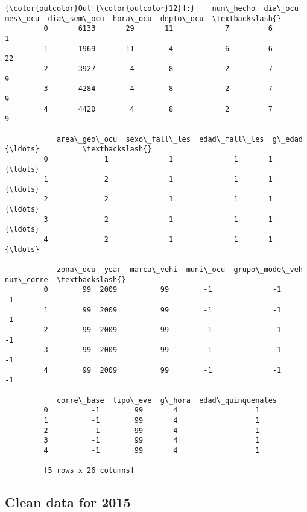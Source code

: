 \documentclass[11pt]{article}
\begin{document}
\begin{Verbatim}[commandchars=\\\{\}]
{\color{outcolor}Out[{\color{outcolor}12}]:}    num\_hecho  dia\_ocu  mes\_ocu  dia\_sem\_ocu  hora\_ocu  depto\_ocu  \textbackslash{}
         0       6133       29       11            7         6          1   
         1       1969       11        4            6         6         22   
         2       3927        4        8            2         7          9   
         3       4284        4        8            2         7          9   
         4       4420        4        8            2         7          9   
         
            area\_geo\_ocu  sexo\_fall\_les  edad\_fall\_les  g\_edad        {\ldots}          \textbackslash{}
         0             1              1              1       1        {\ldots}           
         1             2              1              1       1        {\ldots}           
         2             2              1              1       1        {\ldots}           
         3             2              1              1       1        {\ldots}           
         4             2              1              1       1        {\ldots}           
         
            zona\_ocu  year  marca\_vehi  muni\_ocu  grupo\_mode\_veh  num\_corre  \textbackslash{}
         0        99  2009          99        -1              -1         -1   
         1        99  2009          99        -1              -1         -1   
         2        99  2009          99        -1              -1         -1   
         3        99  2009          99        -1              -1         -1   
         4        99  2009          99        -1              -1         -1   
         
            corre\_base  tipo\_eve  g\_hora  edad\_quinquenales  
         0          -1        99       4                  1  
         1          -1        99       4                  1  
         2          -1        99       4                  1  
         3          -1        99       4                  1  
         4          -1        99       4                  1  
         
         [5 rows x 26 columns]
\end{Verbatim}
            
    \hypertarget{clean-data-for-2015}{%
\subsection{Clean data for 2015}\label{clean-data-for-2015}}
\end{document}
